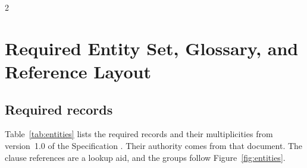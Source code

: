 \begin{multicols}{2}
\section[Required Entity Set, Glossary, and Reference Layout]{Required Entity Set, Glossary, and\\Reference Layout}
\label{app:entities}
\setcounter{table}{0}
\setcounter{figure}{0}

\subsection{Required records}

Table~\ref{tab:entities} lists the required records and their multiplicities from version~1.0 of the Specification \citep[\hyperlink{nss-appA}{Appendix~A}]{pss2026}. Their authority comes from that document. The clause references are a lookup aid, and the groups follow Figure~\ref{fig:entities}.
\end{multicols}

